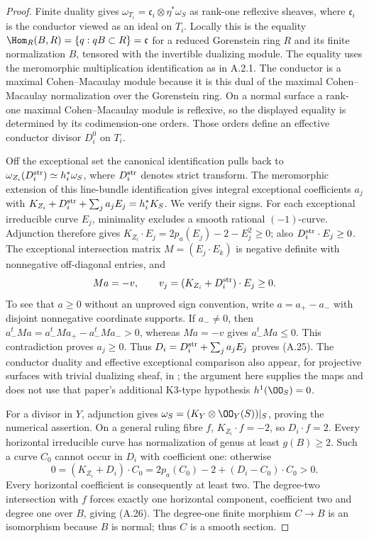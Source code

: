 \begin{proof}
Finite duality gives $\omega_{T_i}=\mathfrak c_i\otimes\eta^*\omega_S$ as rank-one reflexive sheaves, where $\mathfrak c_i$ is the conductor viewed as an ideal on $T_i$. Locally this is the equality
$\Hom_R(B,R)=\{q:qB\subset R\}=\mathfrak c$ for a reduced Gorenstein ring $R$ and its finite normalization $B$, tensored with the invertible dualizing module. The equality uses the meromorphic multiplication identification as in A.2.1. The conductor is a maximal Cohen--Macaulay module because it is this dual of the maximal Cohen--Macaulay normalization over the Gorenstein ring. On a normal surface a rank-one maximal Cohen--Macaulay module is reflexive, so the displayed equality is determined by its codimension-one orders. Those orders define an effective conductor divisor $D_i^0$ on $T_i$.

Off the exceptional set the canonical identification pulls back to $\omega_{Z_i}(D_i^{\rm str})\simeq h_i^*\omega_S$, where $D_i^{\rm str}$ denotes strict transform. The meromorphic extension of this line-bundle identification gives integral exceptional coefficients $a_j$ with
$K_{Z_i}+D_i^{\rm str}+\sum_j a_jE_j=h_i^*K_S$.
We verify their signs. For each exceptional irreducible curve $E_j$, minimality excludes a smooth rational $(-1)$-curve. Adjunction therefore gives
$K_{Z_i}\cdot E_j=2p_a(E_j)-2-E_j^2\ge0$;
also $D_i^{\rm str}\cdot E_j\ge0$. The exceptional intersection matrix $M=(E_j\cdot E_k)$ is negative definite with nonnegative off-diagonal entries, and
\[
 M a=-v,\qquad v_j=(K_{Z_i}+D_i^{\rm str})\cdot E_j\ge0.
\]
To see that $a\ge0$ without an unproved sign convention, write $a=a_+-a_-$ with disjoint nonnegative coordinate supports. If $a_-\ne0$, then
$a_-^tMa=a_-^tMa_+-a_-^tMa_->0$,
whereas $Ma=-v$ gives $a_-^tMa\le0$. This contradiction proves $a_j\ge0$. Thus $D_i=D_i^{\rm str}+\sum_j a_jE_j$ proves (A.25). The conductor duality and effective exceptional comparison also appear, for projective surfaces with trivial dualizing sheaf, in \cite[Lemma~1.1 and Corollary~1.4]{Furushima1993}; the argument here supplies the maps and does not use that paper's additional K3-type hypothesis $h^1(\OO_S)=0$.

For a divisor in $Y$, adjunction gives $\omega_S=(K_Y\otimes\OO_Y(S))|_S$, proving the numerical assertion. On a general ruling fibre $f$, $K_{Z_i}\cdot f=-2$, so $D_i\cdot f=2$. Every horizontal irreducible curve has normalization of genus at least $g(B)\ge2$. Such a curve $C_0$ cannot occur in $D_i$ with coefficient one: otherwise
\[
 0=(K_{Z_i}+D_i)\cdot C_0
   =2p_a(C_0)-2+(D_i-C_0)\cdot C_0>0.
\]
Every horizontal coefficient is consequently at least two. The degree-two intersection with $f$ forces exactly one horizontal component, coefficient two and degree one over $B$, giving (A.26). The degree-one finite morphism $C\to B$ is an isomorphism because $B$ is normal; thus $C$ is a smooth section.


\end{proof}

